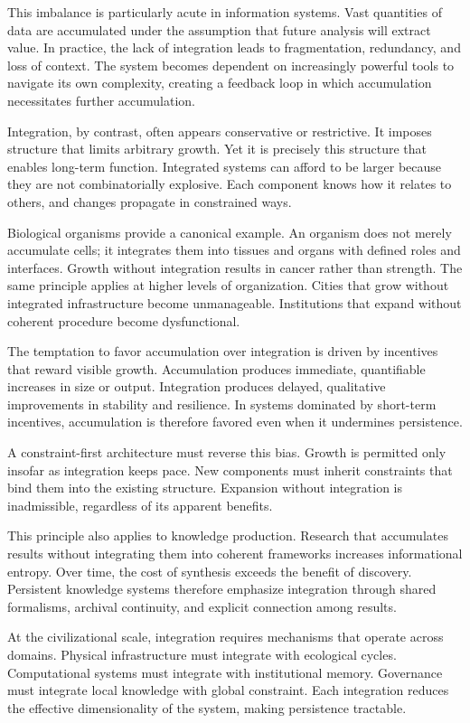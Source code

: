 \documentclass[12pt,oneside]{book}
\begin{document}
This imbalance is particularly acute in information systems. Vast quantities of data are accumulated under the assumption that future analysis will extract value. In practice, the lack of integration leads to fragmentation, redundancy, and loss of context. The system becomes dependent on increasingly powerful tools to navigate its own complexity, creating a feedback loop in which accumulation necessitates further accumulation.

Integration, by contrast, often appears conservative or restrictive. It imposes structure that limits arbitrary growth. Yet it is precisely this structure that enables long-term function. Integrated systems can afford to be larger because they are not combinatorially explosive. Each component knows how it relates to others, and changes propagate in constrained ways.

Biological organisms provide a canonical example. An organism does not merely accumulate cells; it integrates them into tissues and organs with defined roles and interfaces. Growth without integration results in cancer rather than strength. The same principle applies at higher levels of organization. Cities that grow without integrated infrastructure become unmanageable. Institutions that expand without coherent procedure become dysfunctional.

The temptation to favor accumulation over integration is driven by incentives that reward visible growth. Accumulation produces immediate, quantifiable increases in size or output. Integration produces delayed, qualitative improvements in stability and resilience. In systems dominated by short-term incentives, accumulation is therefore favored even when it undermines persistence.

A constraint-first architecture must reverse this bias. Growth is permitted only insofar as integration keeps pace. New components must inherit constraints that bind them into the existing structure. Expansion without integration is inadmissible, regardless of its apparent benefits.

This principle also applies to knowledge production. Research that accumulates results without integrating them into coherent frameworks increases informational entropy. Over time, the cost of synthesis exceeds the benefit of discovery. Persistent knowledge systems therefore emphasize integration through shared formalisms, archival continuity, and explicit connection among results.

At the civilizational scale, integration requires mechanisms that operate across domains. Physical infrastructure must integrate with ecological cycles. Computational systems must integrate with institutional memory. Governance must integrate local knowledge with global constraint. Each integration reduces the effective dimensionality of the system, making persistence tractable.
\end{document}
